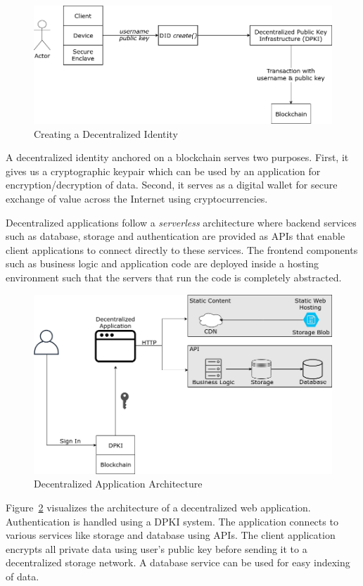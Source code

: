 	\begin{figure}[h]
		\includegraphics[width=\linewidth]{figures/did-create}
		\caption{\label{fig:did-create} Creating a Decentralized Identity}
	\end{figure}
	
	A decentralized identity anchored on a blockchain serves two purposes. First, it gives us a cryptographic keypair which can be used by an application for encryption/decryption of data. Second, it serves as a digital wallet for secure exchange of value across the Internet using cryptocurrencies.
	
	Decentralized applications follow a \textit{serverless} architecture where backend services such as database, storage and authentication are provided as APIs that enable client applications to connect directly to these services. The frontend components such as business logic and application code are deployed inside a hosting environment such that the servers that run the code is completely abstracted.
	
	\begin{figure}[h]
		\includegraphics[width=\linewidth]{figures/dapp-architecture}
		\caption{\label{fig:dapp-architecture} Decentralized Application Architecture}
	\end{figure}

	Figure~\ref{fig:dapp-architecture} visualizes the architecture of a decentralized web application. Authentication is handled using a DPKI system. The application connects to various services like storage and database using APIs. The client application encrypts all private data using user's public key before sending it to a decentralized storage network. A database service can be used for easy indexing of data.
